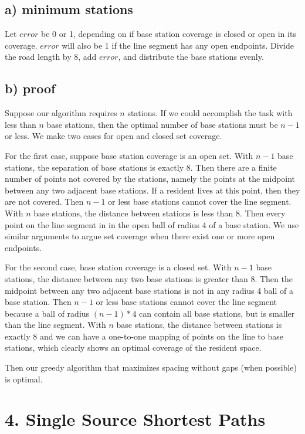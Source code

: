 \documentclass{article}
\begin{document}
\subsection*{a) minimum stations}
Let $error$ be 0 or 1, depending on if base station coverage is closed or open
in its coverage. $error$ will also be 1 if the line segment has any open
endpoints.
Divide the road length by 8, add $error$, and distribute the base stations
evenly.

\subsection*{b) proof}
Suppose our algorithm requires $n$ stations. If we could accomplish the task
with less than $n$ base stations, then the optimal number of base stations
must be $n - 1$ or less. We make two cases for open and closed set coverage.

For the first case, suppose base station coverage is an open set. With $n - 1$
base stations, the separation of base stations is exactly 8. Then there are
a finite number of points not covered by the stations, namely the points at
the midpoint between any two adjacent base stations. If a resident lives at
this point, then they are not covered. Then $n - 1$ or less base stations
cannot cover the line segment. With $n$ base stations, the distance between
stations is less than 8. Then every point on the line segment in in the open
ball of radius 4 of a base station. We use similar arguments to argue set
coverage when there exist one or more open endpoints.

For the second case, base station coverage is a closed set. With $n - 1$ base
stations, the distance between any two base stations is greater than 8. Then
the midpoint between any two adjacent base stations is not in any radius 4
ball of a base station. Then $n - 1$ or less base stations cannot cover the
line segment because a ball of radius $(n - 1) * 4$ can contain all base
stations, but is smaller than the line segment. With $n$ base stations, the
distance between stations is exactly 8 and we can have a one-to-one mapping
of points on the line to base stations, which clearly shows an optimal
coverage of the resident space.

Then our greedy algorithm that maximizes spacing without gaps
(when possible) is optimal.

\section*{4. Single Source Shortest Paths}
\end{document}

